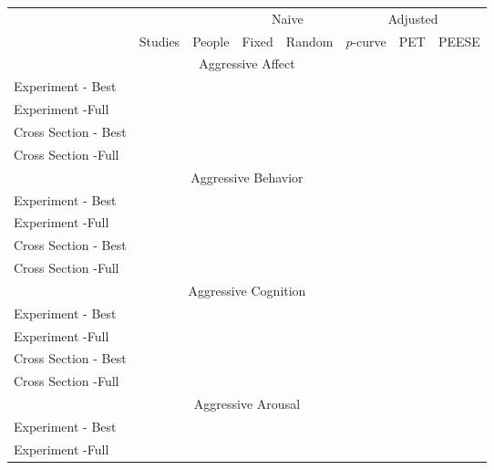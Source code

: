 \documentclass{article}
\begin{document}
\begin{tabular}{lccccccc}
& & &\multicolumn{2}{c}{Naive}&\multicolumn{3}{c}{Adjusted}\\
&Studies&People&Fixed&Random&$p$-curve&PET&PEESE\\  \hline
\multicolumn{8}{c}{Aggressive Affect}\\
Experiment - Best &\\
Experiment -Full &\\
Cross Section - Best &\\
Cross Section -Full &\\
\multicolumn{8}{c}{Aggressive Behavior}\\
Experiment - Best &\\
Experiment -Full &\\
Cross Section - Best &\\
Cross Section -Full &\\
\multicolumn{8}{c}{Aggressive Cognition}\\
Experiment - Best &\\
Experiment -Full &\\
Cross Section - Best &\\
Cross Section -Full &\\
\multicolumn{8}{c}{Aggressive Arousal}\\
Experiment - Best &\\
Experiment -Full &\\
\end{tabular}
\end{document}
